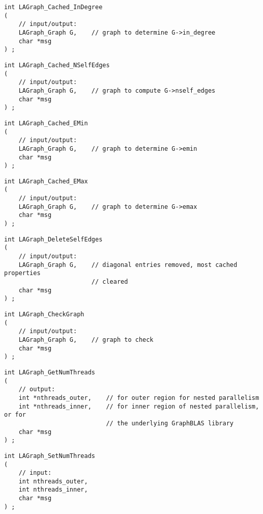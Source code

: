 \begin{verbatim}
int LAGraph_Cached_InDegree
(
    // input/output:
    LAGraph_Graph G,    // graph to determine G->in_degree
    char *msg
) ;
\end{verbatim}




\begin{verbatim}
int LAGraph_Cached_NSelfEdges
(
    // input/output:
    LAGraph_Graph G,    // graph to compute G->nself_edges
    char *msg
) ;
\end{verbatim}




\begin{verbatim}
int LAGraph_Cached_EMin
(
    // input/output:
    LAGraph_Graph G,    // graph to determine G->emin
    char *msg
) ;
\end{verbatim}




\begin{verbatim}
int LAGraph_Cached_EMax
(
    // input/output:
    LAGraph_Graph G,    // graph to determine G->emax
    char *msg
) ;
\end{verbatim}




\begin{verbatim}
int LAGraph_DeleteSelfEdges
(
    // input/output:
    LAGraph_Graph G,    // diagonal entries removed, most cached properties
                        // cleared
    char *msg
) ;
\end{verbatim}




\begin{verbatim}
int LAGraph_CheckGraph
(
    // input/output:
    LAGraph_Graph G,    // graph to check
    char *msg
) ;
\end{verbatim}




\begin{verbatim}
int LAGraph_GetNumThreads
(
    // output:
    int *nthreads_outer,    // for outer region for nested parallelism
    int *nthreads_inner,    // for inner region of nested parallelism, or for
                            // the underlying GraphBLAS library
    char *msg
) ;
\end{verbatim}




\begin{verbatim}
int LAGraph_SetNumThreads
(
    // input:
    int nthreads_outer,
    int nthreads_inner,
    char *msg
) ;
\end{verbatim}




